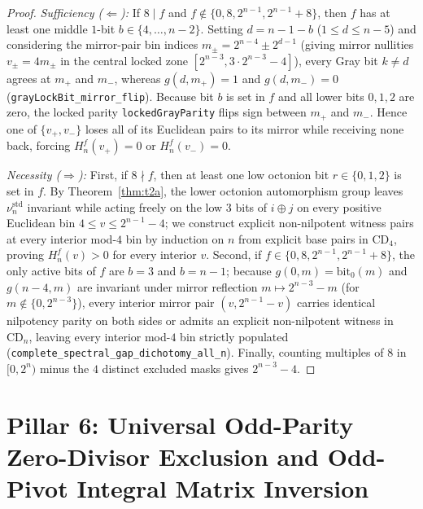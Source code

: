 \documentclass[11pt,reqno]{amsart}
\newcommand{\code}[1]{\textnormal{\texttt{\small\nolinkurl{#1}}}}
\theoremstyle{plain}
\theoremstyle{definition}
\theoremstyle{remark}
\newcommand{\CD}{\mathrm{CD}}
\newcommand{\std}{\mathrm{std}}
\begin{document}
\begin{proof}
\emph{Sufficiency ($\Leftarrow$):} If $8 \mid f$ and $f \notin \{0, 8, 2^{n-1}, 2^{n-1} + 8\}$,
then $f$ has at least one middle $1$-bit $b \in \{4, \dots, n - 2\}$. Setting $d = n - 1 - b$
($1 \le d \le n - 5$) and considering the mirror-pair bin indices
$m_\pm = 2^{n-4} \pm 2^{d-1}$ (giving mirror nullities $v_\pm = 4m_\pm$ in the central locked
zone $[2^{n-3}, 3 \cdot 2^{n-3} - 4]$), every Gray bit $k \neq d$ agrees at $m_+$ and $m_-$,
whereas $g(d, m_+) = 1$ and $g(d, m_-) = 0$ (\code{grayLockBit_mirror_flip}). Because bit $b$ is
set in $f$ and all lower bits $0, 1, 2$ are zero, the locked parity \code{lockedGrayParity} flips
sign between $m_+$ and $m_-$. Hence one of $\{v_+, v_-\}$ loses all of its Euclidean pairs to its
mirror while receiving none back, forcing $H_n^f(v_+) = 0$ or $H_n^f(v_-) = 0$.

\emph{Necessity ($\Rightarrow$):} First, if $8 \nmid f$, then at least one low octonion bit
$r \in \{0, 1, 2\}$ is set in $f$. By Theorem~\ref{thm:t2a}, the lower octonion automorphism group
leaves $\nu_n^{\std}$ invariant while acting freely on the low $3$ bits of $i \oplus j$ on every
positive Euclidean bin $4 \le v \le 2^{n-1} - 4$; we construct explicit non-nilpotent witness
pairs at every interior mod-$4$ bin by induction on $n$ from explicit base pairs in $\CD_4$,
proving $H_n^f(v) > 0$ for every interior $v$. Second, if $f \in \{0, 8, 2^{n-1}, 2^{n-1} + 8\}$,
the only active bits of $f$ are $b = 3$ and $b = n - 1$; because $g(0, m) = \mathrm{bit}_0(m)$ and
$g(n - 4, m)$ are invariant under mirror reflection $m \mapsto 2^{n-3} - m$ (for $m \notin \{0, 2^{n-3}\}$),
every interior mirror pair $(v, 2^{n-1} - v)$ carries identical nilpotency parity on both sides or
admits an explicit non-nilpotent witness in $\CD_n$, leaving every interior mod-$4$ bin strictly
populated (\code{complete_spectral_gap_dichotomy_all_n}). Finally, counting multiples of $8$ in
$[0, 2^n)$ minus the $4$ distinct excluded masks gives $2^{n-3} - 4$.
\end{proof}

\section{Pillar 6: Universal Odd-Parity Zero-Divisor Exclusion and Odd-Pivot Integral Matrix Inversion}
\label{sec:pillar6}
\end{document}
